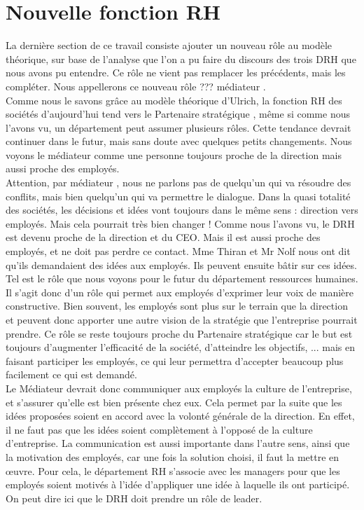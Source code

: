 \section{Nouvelle fonction RH}

La dernière section de ce travail consiste ajouter un nouveau rôle au modèle théorique, sur base de l'analyse que l'on a pu faire du discours des trois DRH que nous avons pu entendre. Ce rôle ne vient pas remplacer les précédents, mais les compléter.  Nous appellerons ce nouveau rôle ??? \og médiateur \fg{}.\\

Comme nous le savons grâce au modèle théorique d'Ulrich, la fonction RH des sociétés d'aujourd'hui tend vers le \og Partenaire stratégique \fg{}, même si comme nous l'avons vu, un département peut assumer plusieurs rôles. Cette tendance devrait continuer dans le futur, mais sans doute avec quelques petits changements. Nous voyons le médiateur comme une personne toujours proche de la direction mais aussi proche des employés. \\

Attention, par \og médiateur \fg{}, nous ne parlons pas de quelqu'un qui va résoudre des conflits, mais bien quelqu'un qui va permettre le dialogue. Dans la quasi totalité des sociétés, les décisions et idées vont toujours dans le même sens : direction vers employés. Mais cela pourrait très bien changer ! Comme nous l'avons vu, le DRH est devenu proche de la direction et du CEO. Mais il est aussi proche des employés, et ne doit pas perdre ce contact. Mme Thiran et Mr Nolf nous ont dit qu'ils demandaient des idées aux employés. Ils peuvent ensuite bâtir sur ces idées. Tel est le rôle que nous voyons pour le futur du département ressources humaines. \\

Il s'agit donc d'un rôle qui permet aux employés d'exprimer leur voix de manière constructive. Bien souvent, les employés sont plus sur le terrain que la direction et peuvent donc apporter une autre vision de la stratégie que l'entreprise pourrait prendre. Ce rôle se reste toujours proche du \og Partenaire stratégique \fg{} car le but est toujours d'augmenter l'efficacité de la société, d'atteindre les objectifs, ... mais en faisant participer les employés, ce qui leur permettra d'accepter beaucoup plus facilement ce qui est demandé.\\

Le \og Médiateur \fg{} devrait donc communiquer aux employés la culture de l'entreprise, et s'assurer qu'elle est bien présente chez eux. Cela permet par la suite que les idées proposées soient en accord avec la volonté générale de la direction. En effet, il ne faut pas que les idées soient complètement à l'opposé de la culture d'entreprise. La communication est aussi importante dans l'autre sens, ainsi que la motivation des employés, car une fois la solution choisi, il faut la mettre en œuvre. Pour cela, le département RH s'associe avec les managers pour que les employés soient motivés à l'idée d'appliquer une idée à laquelle ils ont participé. On peut dire ici que le DRH doit prendre un rôle de leader. \\ 
